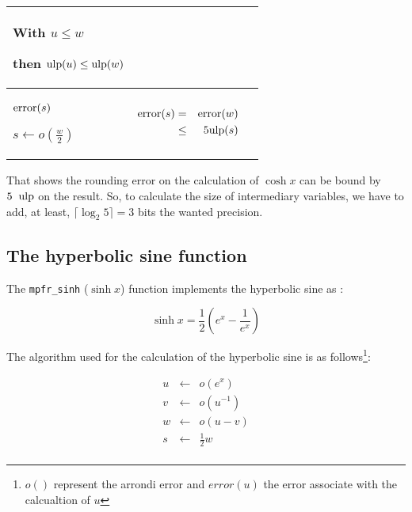 \documentclass[12pt]{amsart}
\def\ulp{{\rm ulp}}
\begin{document}
\begin{center}
\begin{tabular}{l|l |l}
\begin{minipage}{6cm}
With $u \leq w$ 

then $\ulp(u) \leq \ulp(w)$

\end{minipage}\\\hline
\begin{minipage}{2.5cm}
${\textnormal{error}}(s)$

$s \leftarrow o(\frac{w}{2}) $
\end{minipage} &
\begin{minipage}{7.5cm}

\begin{center}


\begin{eqnarray}\nonumber
 {\textnormal{error}}(s) & = &  {\textnormal{error}}(w)\\\nonumber
 & \leq &  5\ulp(s)
\end{eqnarray}



\end{center}

\end{minipage} &
\begin{minipage}{6cm}


\end{minipage}


\end{tabular}
\end{center}

That shows the rounding error on the calculation of $\cosh x$ can be
bound by $5 \;\; \ulp$ on the result. So, to calculate the size of
intermediary variables, we have to add, at least, $\lceil \log_2 5 \rceil=3$ bits the wanted
precision.
 

\subsection{The hyperbolic sine function}

The {\tt mpfr\_sinh} ($\sinh{x}$) function implements the hyperbolic
sine as :

$$
\sinh x = \frac{1}{2} \left( e^{x} - \frac{1}{e^x} \right) 
$$

The algorithm used for the calculation of the hyperbolic sine is as follows\footnote{$o()$ represent the arrondi error and $error(u)$ the
  error associate with the calcualtion of $u$}:

\begin{eqnarray}\nonumber
u&\leftarrow&o(e^x)\\\label{sinhalgo1}
v&\leftarrow&o({u}^{-1})\\\label{sinhalgo2}
w&\leftarrow&o(u-v)\\\label{sinhalgo3}
s&\leftarrow&\frac{1}{2} w\\\label{sinhalgo4}
\end{eqnarray}
\end{document}
